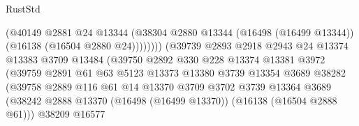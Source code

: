 \begin{lexlean}{RustStd}
\begin{coremodule}
                                          (@40149
                                            @2881
                                            @24
                                            @13344
                                            (@38304
                                              @2880
                                              @13344
                                              (@16498 (@16499 @13344))
                                              (@16138 (@16504 @2880 @24))))))))
                                  (@39739
                                    @2893
                                    @2918
                                    @2943
                                    @24
                                    @13374
                                    @13383
                                    @3709
                                    @13484
                                    (@39750
                                      @2892
                                      @330
                                      @228
                                      @13374
                                      @13381
                                      @3972
                                      (@39759
                                        @2891
                                        @61
                                        @63
                                        @5123
                                        @13373
                                        @13380
                                        @3739
                                        @13354
                                        @3689
                                        @38282
                                        (@39758
                                          @2889
                                          @116
                                          @61
                                          @14
                                          @13370
                                          @3709
                                          @3702
                                          @3739
                                          @13364
                                          @3689
                                          (@38242
                                            @2888
                                            @13370
                                            (@16498 (@16499 @13370))
                                            (@16138 (@16504 @2888 @61)))
                                          @38209
                                          @16577

\end{coremodule}
\end{lexlean}
